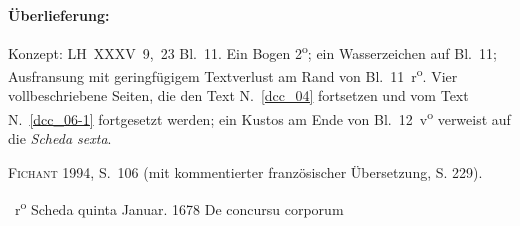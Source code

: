 %
%
%
%
%
\frenchspacing%
%
\begin{ledgroupsized}[r]{120mm}%
\footnotesize%
\pstart%
\noindent\textbf{Überlieferung:}%
\pend%
\end{ledgroupsized}%
\begin{ledgroupsized}[r]{114mm}%
\footnotesize%
\pstart%
\parindent -6mm%
%
Konzept: LH~XXXV~9,~23 Bl.~11.
Ein Bogen 2\textsuperscript{o};
ein Wasserzeichen auf Bl.~11;
Ausfransung mit geringfügigem Textverlust am Rand von Bl.~11~r\textsuperscript{o}.
Vier vollbeschriebene Seiten,
die den Text N.~\ref{dcc_04} %
fortsetzen und vom Text N.~\ref{dcc_06-1} %
fortgesetzt werden;
ein Kustos am Ende von Bl.~12~v\textsuperscript{o} verweist auf die \textit{Scheda sexta}.
\pend%
\end{ledgroupsized}%
%
\begin{ledgroupsized}[r]{114mm}%
\footnotesize%
\pstart%
\parindent -6mm%
%
\textsc{Fichant} 1994, S.~106\cite{01056}
(mit kommentierter französischer Übersetzung, S. 229).
\pend%
\end{ledgroupsized}%
%
%
\frenchspacing%
%
%
\vspace{8mm}
\count{}%
\count{}%
\count{}%
\normalsize%
\pstart%
\noindent%
%
~r\textsuperscript{o}\rbrack%
%
\hspace{47mm}
Scheda quinta%
\protect{}%
\hspace{36mm}
Januar. 1678%
\pend%
\pstart%
\noindent%
\centering%
De concursu
%
corporum%
\protect{}
\pend%
\vspace{0.5em}%
